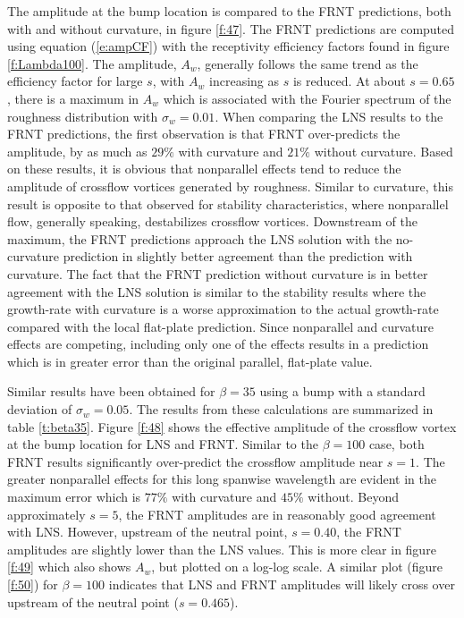 The amplitude at the bump location is compared to the FRNT predictions, both
with and without curvature, in figure \ref{f:47}.  The FRNT predictions are
computed using equation (\ref{e:ampCF}) with the receptivity efficiency
factors found in figure \ref{f:Lambda100}.  The amplitude, $A_w$, generally
follows the same trend as the efficiency factor for large $s$, with $A_w$
increasing as $s$ is reduced.  At about $s=0.65$, there is a maximum in $A_w$
which is associated with the Fourier spectrum of the roughness distribution
with $\sigma_w=0.01$.  When comparing the LNS results to the FRNT predictions,
the first observation is that FRNT over-predicts the amplitude, by as much as
$29\%$ with curvature and $21\%$ without curvature.  Based on these results,
it is obvious that nonparallel effects tend to reduce the amplitude of
crossflow vortices generated by roughness.  Similar to curvature, this result
is opposite to that observed for stability characteristics, where nonparallel
flow, generally speaking, destabilizes crossflow vortices.  Downstream of the
maximum, the FRNT predictions approach the LNS solution with the no-curvature
prediction in slightly better agreement than the prediction with curvature.
The fact that the FRNT prediction without curvature is in better agreement
with the LNS solution is similar to the stability results where the
growth-rate with curvature is a worse approximation to the actual growth-rate
compared with the local flat-plate prediction.  Since nonparallel and
curvature effects are competing, including only one of the effects results in
a prediction which is in greater error than the original parallel, flat-plate
value.

Similar results have been obtained for $\beta=35$ using a bump with a standard
deviation of $\sigma_w=0.05$.  The results from these calculations are
summarized in table \ref{t:beta35}.  Figure \ref{f:48} shows the effective
amplitude of the crossflow vortex at the bump location for LNS and FRNT.
Similar to the $\beta=100$ case, both FRNT results significantly over-predict
the crossflow amplitude near $s=1$.  The greater nonparallel effects for this
long spanwise wavelength are evident in the maximum error which is $77\%$ with
curvature and $45\%$ without.  Beyond approximately $s=5$, the FRNT amplitudes
are in reasonably good agreement with LNS.  However, upstream of the neutral
point, $s=0.40$, the FRNT amplitudes are slightly lower than the LNS values.
This is more clear in figure \ref{f:49} which also shows $A_w$, but plotted on
a log-log scale.  A similar plot (figure \ref{f:50}) for $\beta=100$ indicates
that LNS and FRNT amplitudes will likely cross over upstream of the neutral
point ($s = 0.465$).

